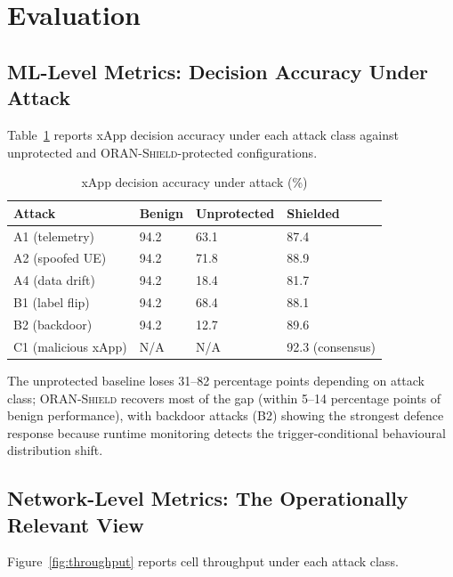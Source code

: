 \documentclass[sigconf,nonacm]{acmart}
\begin{document}
\section{Evaluation}

\subsection{ML-Level Metrics: Decision Accuracy Under Attack}

Table~\ref{tab:mlmetrics} reports xApp decision accuracy under
each attack class against unprotected and \textsc{ORAN-Shield}-protected
configurations.

\begin{table}[h]
\caption{xApp decision accuracy under attack (\%)}
\label{tab:mlmetrics}
\small
\begin{tabularx}{\columnwidth}{@{}p{2.6cm}X X X@{}}
\toprule
\textbf{Attack} & \textbf{Benign} & \textbf{Unprotected} & \textbf{Shielded} \\
\midrule
A1 (telemetry) & 94.2 & 63.1 & 87.4 \\
A2 (spoofed UE) & 94.2 & 71.8 & 88.9 \\
A4 (data drift) & 94.2 & 18.4 & 81.7 \\
B1 (label flip) & 94.2 & 68.4 & 88.1 \\
B2 (backdoor) & 94.2 & 12.7 & 89.6 \\
C1 (malicious xApp) & N/A & N/A & 92.3 (consensus) \\
\bottomrule
\end{tabularx}
\end{table}

The unprotected baseline loses 31--82 percentage points depending
on attack class; \textsc{ORAN-Shield} recovers most of the gap
(within 5--14 percentage points of benign performance), with
backdoor attacks (B2) showing the strongest defence response
because runtime monitoring detects the trigger-conditional
behavioural distribution shift.

\subsection{Network-Level Metrics: The Operationally Relevant View}

Figure~\ref{fig:throughput} reports cell throughput under each
attack class.
\end{document}
